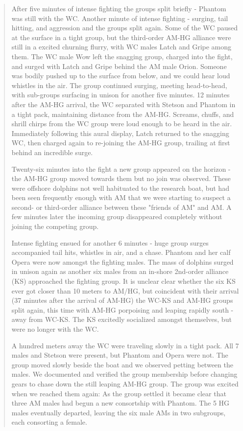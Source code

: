 \documentclass[11pt]{amsart}
\begin{document}
\begin{quote}
After five minutes of intense fighting the groups split briefly - Phantom was still with the WC. Another minute of intense fighting - surging, tail hitting, and aggression and the groups split again. Some of the WC paused at the surface in a tight group, but the third-order AM-HG alliance were still in a excited churning flurry, with WC males Latch and Gripe among them. The WC male Wow left the snagging group, charged into the fight, and surged with Latch and Gripe behind the AM male Orion. Someone was bodily pushed up to the surface from below, and we could hear loud whistles in the air. The group continued surging, meeting head-to-head, with sub-groups surfacing in unison for another five minutes. 12 minutes after the AM-HG arrival, the WC separated with Stetson and Phantom in a tight pack, maintaining distance from the AM-HG. Screams, chuffs, and shrill chirps from the WC group were loud enough to be heard in the air. Immediately following this aural display, Latch returned to the snagging WC, then charged again to re-joining the AM-HG group, trailing at first behind an incredible surge. 

Twenty-six minutes into the fight a new group appeared on the horizon - the AM-HG group moved towards them but no join was observed. These were offshore dolphins not well habituated to the research boat, but had been seen frequently enough with AM that we were starting to suspect a second- or third-order alliance between these "friends of AM" and AM. A few minutes later the incoming group disappeared completely without joining the competing group.


Intense fighting ensued for another 6 minutes - huge group surges accompanied tail hits, whistles in air, and a chase. Phantom and her calf Opera were now amongst the fighting males. The mass of dolphins surged in unison again as another six males from an in-shore 2nd-order alliance (KS) approached the fighting group. It is unclear clear whether the six KS ever got closer than 10 meters to AM/HG, but coincident with their arrival (37 minutes after the arrival of AM-HG) the WC-KS and AM-HG groups split again, this time with AM-HG porpoising and leaping rapidly south - away from WC-KS. The KS excitedly socialized amongst themselves, but were no longer with the WC.

A hundred meters away the WC were traveling slowly in a tight pack. All 7 males and Stetson were present, but Phantom and Opera were not. The group moved slowly beside the boat and we observed petting between the males. We documented and verified the group membership before changing gears to chase down the still leaping AM-HG group. The group was excited when we reached them again: %
As the group settled it became clear that three AM males had begun a new consortship with Phantom. %
The 5 HG males eventually departed, leaving the six male AMs in two subgroups, each consorting a female.
\end{quote}
\end{document}
